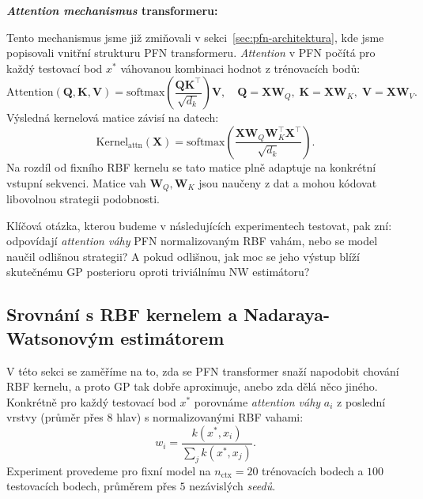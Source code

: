 \textbf{\emph{Attention mechanismus} transformeru:}

Tento mechanismus jsme již zmiňovali v sekci~\ref{sec:pfn-architektura}, kde jsme popisovali vnitřní strukturu PFN transformeru.
\emph{Attention} v PFN počítá pro každý testovací bod $x^*$ váhovanou kombinaci hodnot z trénovacích bodů:
$$\text{Attention}(\mathbf{Q}, \mathbf{K}, \mathbf{V}) = \text{softmax}\!\left(\frac{\mathbf{Q}\mathbf{K}^\top}{\sqrt{d_k}}\right)\mathbf{V}, \quad \mathbf{Q} = \mathbf{X}\mathbf{W}_Q,\; \mathbf{K} = \mathbf{X}\mathbf{W}_K,\; \mathbf{V} = \mathbf{X}\mathbf{W}_V.$$
Výsledná kernelová matice závisí na datech:
$$\text{Kernel}_{\text{attn}}(\mathbf{X}) = \text{softmax}\!\left(\frac{\mathbf{X} \mathbf{W}_Q \mathbf{W}_K^\top \mathbf{X}^\top}{\sqrt{d_k}}\right).$$
Na rozdíl od fixního RBF kernelu se tato matice plně adaptuje na konkrétní vstupní sekvenci.
Matice vah $\mathbf{W}_Q, \mathbf{W}_K$ jsou naučeny z dat a mohou kódovat libovolnou strategii podobnosti.

Klíčová otázka, kterou budeme v následujících experimentech testovat, pak zní: odpovídají \emph{attention váhy} PFN normalizovaným RBF vahám, nebo se model naučil odlišnou strategii?
A pokud odlišnou, jak moc se jeho výstup blíží skutečnému GP posterioru oproti triviálnímu NW estimátoru?

\subsection{Srovnání s RBF kernelem a Nadaraya-Watsonovým estimátorem}
\label{subsec:pfn-vs-rbf}

V této sekci se zaměříme na to, zda se PFN transformer snaží napodobit chování RBF kernelu, a proto GP tak dobře aproximuje, anebo zda dělá něco jiného.
Konkrétně pro každý testovací bod $x^*$ porovnáme \emph{attention váhy} $a_i$ z poslední vrstvy (průměr přes $8$ hlav) s normalizovanými RBF vahami:
$$w_i = \frac{k(x^*, x_i)}{\sum_j k(x^*, x_j)}.$$
Experiment provedeme pro fixní model na $n_{\text{ctx}} = 20$ trénovacích bodech a $100$ testovacích bodech, průměrem přes $5$ nezávislých \emph{seedů}.
\par

